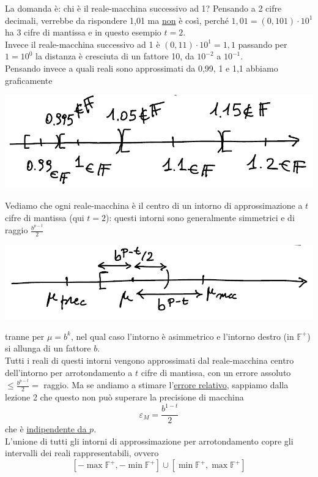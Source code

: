 La domanda è: chi è il reale-macchina successivo ad 1? Pensando a 2 cifre decimali, verrebbe da rispondere 1,01 ma \uline{non} è così, perché $1,01 = (0,101)\cdot 10^1$ ha 3 cifre di mantissa e in questo esempio $t=2$.\\
Invece il reale-macchina successivo ad 1 è $(0,11)\cdot 10^1 = 1,1$ passando per $1 = 10^0$ la distanza è cresciuta di un fattore 10, da $10^{-2}$ a $10^{-1}$.\\
Pensando invece a quali reali sono approssimati da 0,99, 1 e 1,1 abbiamo graficamente
\begin{center}
    \includegraphics[scale=0.65]{foto/img7}
\end{center}
Vediamo che ogni reale-macchina è il centro di un intorno di approssimazione a $t$ cifre di mantissa (qui $t=2$): questi intorni sono generalmente simmetrici e di raggio $\frac{b^{p-t}}{2}$ \begin{center}
    \includegraphics[scale=0.65]{foto/img8}
\end{center}
tranne per $\mu = b^k$, nel qual caso l'intorno è asimmetrico e l'intorno destro (in $\mathbb{F}^+$) si allunga di un fattore $b$.\\
Tutti i reali di questi intorni vengono approssimati dal reale-macchina centro dell'intorno per arrotondamento a $t$ cifre di mantissa, con un errore assoluto $\le \frac{b^{p-t}}{2} =$ raggio. Ma se andiamo a stimare l'\uline{errore relativo}, sappiamo dalla lezione 2 che questo non può superare la precisione di macchina \[ \varepsilon_M = \frac{b^{1-t}}{2} \]
che è \uline{indipendente da $p$}.\\
L'unione di tutti gli intorni di approssimazione per arrotondamento copre gli intervalli dei reali rappresentabili, ovvero
\[ [- \max \mathbb{F}^+ , - \min \mathbb{F}^+] \cup [\min \mathbb{F}^+ , \max \mathbb{F}^+]\]
